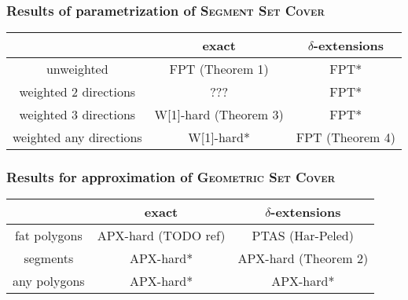 \documentclass{beamer}
\begin{document}
\begin{frame}
\frametitle{Results of parametrization of \textsc{Segment Set Cover}}

\begin{tabular}{|c|c|c|}
\hline
           & exact & $\delta$-extensions \\
\hline
unweighted & \textcolor{olivegreen}{FPT (Theorem 1)} & \textcolor{olivegreen}{FPT*} \\
\hline
weighted 2 directions & ??? & \textcolor{olivegreen}{FPT*} \\
\hline
weighted 3 directions & \textcolor{olivegreen}{W[1]-hard (Theorem 3)} &  \textcolor{olivegreen}{FPT*}\\
\hline
weighted any directions & \textcolor{olivegreen}{W[1]-hard*} &  \textcolor{olivegreen}{FPT (Theorem 4)}\\
\hline
\end{tabular}

\end{frame}


\begin{frame}
\frametitle{Results for approximation of \textsc{Geometric Set Cover}}
\begin{tabular}{|c|c|c|}
\hline
           & exact & $\delta$-extensions \\
\hline
fat polygons & APX-hard (TODO ref) &  PTAS (Har-Peled)\\
\hline
segments & \textcolor{olivegreen}{APX-hard*} & \textcolor{olivegreen}{APX-hard (Theorem 2)} \\
\hline
any polygons & \textcolor{olivegreen}{APX-hard*} &  \textcolor{olivegreen}{APX-hard*} \\
\hline
\end{tabular}
\end{frame}

\end{document}
